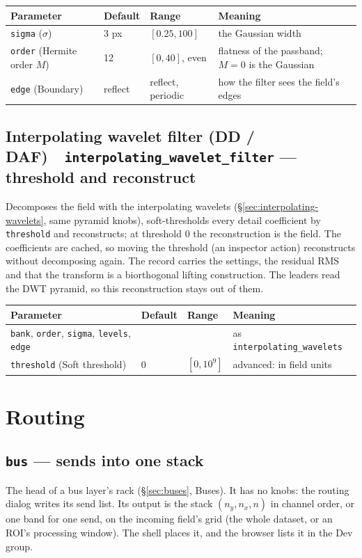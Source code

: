 \documentclass[10pt]{article}
\newcommand{\dev}[1]{\texttt{#1}}
\newcommand{\tool}[2]{#1~\textperiodcentered~\dev{#2}}
\begin{document}
\begin{longtable}{L l l M}
\toprule Parameter & Default & Range & Meaning \\ \midrule
\texttt{sigma} ($\sigma$) & 3 px & $[0.25,100]$ & the Gaussian width \\
\texttt{order} (Hermite order $M$) & 12 & $[0,40]$, even & flatness of the passband; $M = 0$ is the Gaussian \\
\texttt{edge} (Boundary) & reflect & reflect, periodic & how the filter sees the field's edges \\
\bottomrule
\end{longtable}

\subsection{\tool{Interpolating wavelet filter (DD / DAF)}{interpolating\_wavelet\_filter} --- threshold and reconstruct}\label{sec:interpolating-filter}
Decomposes the field with the interpolating wavelets (\S\ref{sec:interpolating-wavelets}, same
pyramid knobs), soft-thresholds every detail coefficient by \texttt{threshold} and reconstructs; at
threshold 0 the reconstruction is the field. The coefficients are cached, so moving the threshold
(an inspector action) reconstructs without decomposing again. The record carries the settings, the
residual RMS and that the transform is a biorthogonal lifting construction. The leaders read the DWT
pyramid, so this reconstruction stays out of them.

\begin{longtable}{L l l M}
\toprule Parameter & Default & Range & Meaning \\ \midrule
\texttt{bank}, \texttt{order}, \texttt{sigma}, \texttt{levels}, \texttt{edge} & & & as \dev{interpolating\_wavelets} \\
\texttt{threshold} (Soft threshold) & 0 & $[0,10^9]$ & advanced: in field units \\
\bottomrule
\end{longtable}

\section{Routing}

\subsection{\dev{bus} --- sends into one stack}
The head of a bus layer's rack (\S\ref{sec:buses}, Buses). It has no knobs: the routing dialog writes
its send list. Its output is the stack $(n_y,n_x,n)$ in channel order, or one band for one
send, on the incoming field's grid (the whole dataset, or an ROI's processing window). The
shell places it, and the browser lists it in the Dev group.
\end{document}
